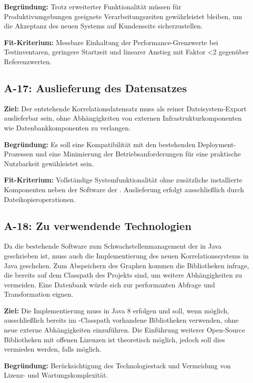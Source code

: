\textbf{Begründung:}
Trotz erweiterter Funktionalität müssen für Produktivumgebungen geeignete Verarbeitungszeiten gewährleistet bleiben, um die Akzeptanz des neuen Systems auf Kundenseite sicherzustellen.

\textbf{Fit-Kriterium:}
Messbare Einhaltung der Performance-Grenzwerte bei Testinventaren, geringere Startzeit und linearer Anstieg mit Faktor <2 gegenüber Referenzwerten.

\subsection{A-17: Auslieferung des Datensatzes}\label{subsec:req-correlation-data-delivery}

\textbf{Ziel:}
Der entstehende Korrelationsdatensatz muss als reiner Dateisystem-Export auslieferbar sein, ohne Abhängigkeiten von externen Infrastrukturkomponenten wie Datenbankkomponenten zu verlangen.

\textbf{Begründung:}
Es soll eine Kompatibilität mit den bestehenden Deployment-Prozessen und eine Minimierung der Betriebsanforderungen für eine praktische Nutzbarkeit gewähleistet sein.

\textbf{Fit-Kriterium:}
Vollständige Systemfunktionalität ohne zusätzliche installierte Komponenten neben der Software der \metaeffekt.
Auslieferung erfolgt ausschließlich durch Dateikopieroperationen.

\subsection{A-18: Zu verwendende Technologien}\label{subsec:req-lang-java}

Da die bestehende Software zum Schwachstellenmanagement der \metaeffektsp in Java geschrieben ist, muss auch die Implementierung des neuen Korrelationssystems in Java geschehen.
Zum Abspeichern des Graphen kommen die Bibliotheken infrage, die bereits auf dem Classpath des Projekts sind, um weitere Abhängigkeiten zu vermeiden.
Eine Datenbank würde sich zur performanten Abfrage und Transformation eignen.

\textbf{Ziel:}
Die Implementierung muss in Java 8 erfolgen und soll, wenn möglich, ausschließlich bereits im \metaeffekt-Classpath vorhandene Bibliotheken verwenden, ohne neue externe Abhängigkeiten einzuführen.
Die Einführung weiterer Open-Source Bibliotheken mit offenen Lizenzen ist theoretisch möglich, jedoch soll dies vermieden werden, falls möglich.

\textbf{Begründung:}
Berücksichtigung des Technologiestack und Vermeidung von Lizenz- und Wartungskomplexität.


